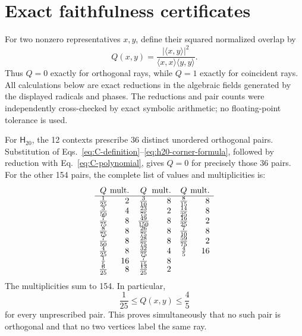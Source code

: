 \documentclass[twocolumn,aps,pra,floatfix,amsmath,amssymb,longbibliography]{revtex4-2}
\theoremstyle{definition}
\theoremstyle{remark}
\newcommand{\Htwenty}{\mathsf H_{20}}
\begin{document}
\appendix

\section{Exact faithfulness certificates}
\label{app:faithfulness}

For two nonzero representatives $x,y$, define their squared normalized
overlap by
\begin{equation}
 Q(x,y)=\frac{|\langle x,y\rangle|^2}
 {\langle x,x\rangle\langle y,y\rangle}.
 \label{eq:Q}
\end{equation}
Thus $Q=0$ exactly for orthogonal rays, while $Q=1$ exactly for
coincident rays.  All calculations below are exact reductions in the
algebraic fields generated by the displayed radicals and phases.  The
reductions and pair counts were independently cross-checked by exact symbolic
arithmetic; no floating-point tolerance is used.

For $\Htwenty$, the 12 contexts prescribe 36 distinct unordered
orthogonal pairs.  Substitution of
Eqs.~\eqref{eq:C-definition}--\eqref{eq:h20-corner-formula}, followed by
reduction with Eq.~\eqref{eq:C-polynomial}, gives $Q=0$ for precisely
those 36 pairs.  For the other 154 pairs, the complete list of values
and multiplicities is:
\begin{equation}
\begin{array}{c@{\;}r@{\quad}c@{\;}r@{\quad}c@{\;}r}
 Q&\text{mult.}&Q&\text{mult.}&Q&\text{mult.}\\ \hline
 \frac1{25}&2&\frac3{10}&8&\frac8{15}&8\\
 \frac3{50}&4&\frac{23}{75}&2&\frac{14}{25}&8\\
 \frac7{75}&8&\frac{49}{150}&8&\frac{16}{25}&2\\
 \frac8{75}&8&\frac{26}{75}&8&\frac7{10}&8\\
 \frac7{50}&8&\frac{28}{75}&8&\frac{59}{75}&2\\
 \frac4{25}&8&\frac{32}{75}&4&\frac45&16\\
 \frac15&16&\frac7{15}&8&&\\[-2pt]
 \frac6{25}&8&\frac{13}{25}&2&&
\end{array}
\label{eq:H20-Q-table}
\end{equation}
The multiplicities sum to 154.  In particular,
\begin{equation}
 \frac1{25}\le Q(x,y)\le\frac45
 \label{eq:H20-Q-bounds}
\end{equation}
for every unprescribed pair.  This proves simultaneously that no such
pair is orthogonal and that no two vertices label the same ray.
\end{document}
